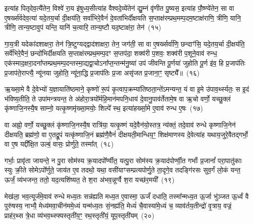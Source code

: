 इत्या॑ह पितृदेव॒त्यै॑तेन॒ विश्वे॑ रा॒य इ॑षुध्य॒सीत्या॑ह वैश्वदे॒व्ये॑तेन॑ द्यु॒म्नं वृ॑णीत पु॒ष्यस॒ इत्या॑ह पौ॒ष्ण्ये॑तेन॒ सा वा ए॒षर्ख्स॑र्वदेव॒त्या॑ यदे॒तय॒र्चा दी॒क्षय॑ति॒ सर्वा॑भिरे॒वैनं॑ दे॒वता॑भिर्दीक्षयति स॒प्ताक्ष॑रम्प्रथ॒मम्प॒दम॒ष्टाक्ष॑राणि॒ त्रीणि॒ यानि॒ त्रीणि॒ तान्य॒ष्टावुप॑ यन्ति॒ यानि॑ च॒त्वारि॒ तान्य॒ष्टौ यद॒ष्टाक्ष॑रा॒ तेन॑~(१५)

गा॒य॒त्री यदेका॑\-दशाक्षरा॒ तेन॑ त्रि॒ष्टुग्यद्द्वाद॑शाक्षरा॒ तेन॒ जग॑ती॒ सा वा ए॒षर्ख्सर्वा॑णि॒ छन्दाꣳ॑सि॒ यदे॒तय॒र्चा दी॒क्षय॑ति॒ सर्वे॑भिरे॒वैनं॒ छन्दो॑भिर्दीक्षयति स॒प्ताक्ष॑रम्प्रथ॒मम्प॒दꣳ स॒प्तप॑दा॒ शक्व॑री प॒शवः॒ शक्व॑री प॒शूने॒वाव॑ रुन्ध॒ एक॑स्माद॒क्षरा॒दना᳚प्तम्प्रथ॒मम्प॒दन्तस्मा॒द्यद्वा॒चो\-ऽना᳚प्त॒न्तन्म॑नु॒ष्या॑ उप॑ जीवन्ति पू॒र्णया॑ जुहोति पू॒र्ण इ॑व॒ हि प्र॒जा\-प॑तिः प्र॒जाप॑ते॒राप्त्यै॒ न्यू॑नया जुहोति॒ न्यू॑ना॒द्धि प्र॒जा\-प॑तिः प्र॒जा असृ॑जत प्र॒जाना॒ꣳ॒ सृष्ट्यै᳚॥~(१६)

{\anuvakamend[{अ॒ग्नये॒ ता वृ॑धात्वृ॒चा स॒ख्यन्तेन॑ जुहोति॒ पञ्च॑दश च}]}%

ऋ॒ख्सा॒मे वै दे॒वेभ्यो॑ य॒ज्ञायाति॑ष्ठमाने॒ कृष्णो॑ रू॒पं कृ॒त्वाप॒क्रम्या॑तिष्ठता॒न्ते॑\-ऽमन्यन्त॒ यं वा इ॒मे उ॑पाव॒र्थ्स्यतः॒ स इ॒दं भ॑विष्य॒तीति॒ ते उपा॑मन्त्रयन्त॒ ते अ॑होरा॒त्रयो᳚र्महि॒मान॑मपनि॒धाय॑ दे॒वानु॒पाव॑र्तेतामे॒ष वा ऋ॒चो वर्णो॒ यच्छु॒क्लं कृ॑ष्णाजि॒नस्यै॒ष साम्नो॒ यत्कृ॒ष्णमृ॑ख्सा॒मयोः॒ शिल्पे᳚ स्थ॒ इत्या॑हर्ख्सा॒मे ए॒वाव॑ रुन्ध ए॒षः~(१७)

वा अह्नो॒ वर्णो॒ यच्छु॒क्लं कृ॑ष्णाजि॒नस्यै॒ष रात्रि॑या॒ यत्कृ॒ष्णं यदे॒वैन॑यो॒स्तत्र॒ न्य॑क्तं॒ तदे॒वाव॑ रुन्धे कृष्णाजि॒नेन॑ दीक्षयति॒ ब्रह्म॑णो॒ वा ए॒तद्रू॒पं यत्कृ॑ष्णाजि॒नं ब्रह्म॑णै॒वैनं॑ दीक्षयती॒मान्धिय॒ꣳ॒ शिक्ष॑माणस्य दे॒वेत्या॑ह यथाय॒जुरे॒वैतद्गर्भो॒ वा ए॒ष यद्दी᳚क्षि॒त उल्बं॒ वासः॒ प्रोर्णु॑ते॒ तस्मा᳚त्~(१८)

गर्भाः॒ प्रावृ॑ता जायन्ते॒ न पु॒रा सोम॑स्य क्र॒यादपो᳚र्ण्वीत॒ यत्पु॒रा सोम॑स्य क्र॒याद॑पोर्ण्वी॒त गर्भाः᳚ प्र॒जानां᳚ परा॒पातु॑काः स्युः क्री॒ते सोमे\-ऽपो᳚र्णुते॒ जाय॑त ए॒व तदथो॒ यथा॒ वसी॑याꣳसम्प्रत्यपोर्णु॒ते ता॒दृगे॒व तदङ्गि॑रसः सुव॒र्गं लो॒कं यन्त॒ ऊर्जं॒ व्य॑भजन्त॒ ततो॒ यद॒त्यशि॑ष्यत॒ ते श॒रा अ॑भव॒न्नूर्ग्वै श॒रा यच्छ॑र॒मयी᳚~(१९)

मेख॑ला॒ भव॒त्यूर्ज॑मे॒वाव॑ रुन्धे मध्य॒तः सन्न॑ह्यति मध्य॒त ए॒वास्मा॒ ऊर्जं॑ दधाति॒ तस्मा᳚न्मध्य॒त ऊ॒र्जा भु॑ञ्जत ऊ॒र्ध्वं वै पुरु॑षस्य॒ नाभ्यै॒ मेध्य॑मवा॒चीन॑ममे॒ध्यं यन्म॑ध्य॒तः सं॒नह्य॑ति॒ मेध्यं॑ चै॒वास्या॑मे॒ध्यं च॒ व्याव॑र्तय॒तीन्द्रो॑ वृ॒त्राय॒ वज्रं॒ प्राह॑र॒थ्स त्रे॒धा व्य॑भव॒थ्स्फ्यस्तृती॑य॒ꣳ॒ रथ॒स्तृती॑यं॒ यूप॒स्तृती॑यम्~(२०)

